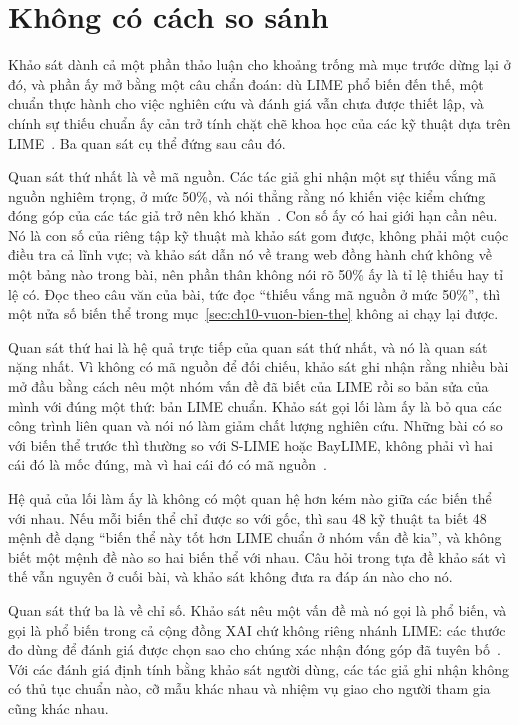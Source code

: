 \section{Không có cách so sánh}
\label{sec:ch10-khong-co-cach-so-sanh}

%
Khảo sát dành cả một phần thảo luận cho khoảng trống mà mục trước dừng lại ở
đó, và phần ấy mở bằng một câu chẩn đoán: dù LIME phổ biến đến thế, một chuẩn thực
hành cho việc nghiên cứu và đánh giá vẫn chưa được thiết lập, và chính sự thiếu
chuẩn ấy cản trở tính chặt chẽ khoa học của các kỹ thuật dựa trên
LIME~\autocite{p22whichlime}. Ba quan sát cụ thể đứng sau câu đó.

Quan sát thứ nhất là về mã nguồn. Các tác giả ghi nhận một sự thiếu vắng mã
nguồn nghiêm trọng, ở mức 50\%, và nói thẳng rằng nó khiến việc kiểm chứng đóng
góp của các tác giả trở nên khó khăn~\autocite{p22whichlime}. Con số ấy có hai
giới hạn cần nêu. Nó là con số của riêng tập kỹ thuật mà khảo sát gom được,
không phải một cuộc điều tra cả lĩnh vực; và khảo sát dẫn nó về trang web đồng
hành chứ không về một bảng nào trong bài, nên phần thân không nói rõ 50\% ấy là
tỉ lệ thiếu hay tỉ lệ có. Đọc theo câu văn của bài, tức đọc \enquote{thiếu vắng
mã nguồn ở mức 50\%}, thì một nửa số biến thể trong
mục~\ref{sec:ch10-vuon-bien-the} không ai chạy lại được.

Quan sát thứ hai là hệ quả trực tiếp của quan sát thứ nhất, và nó là quan sát
nặng nhất. Vì không có mã nguồn để đối chiếu, khảo sát ghi nhận rằng nhiều bài
mở đầu bằng cách nêu một nhóm vấn đề đã biết của LIME rồi so bản sửa của mình
với đúng một thứ: bản LIME chuẩn. Khảo sát gọi lối làm ấy là bỏ qua các công
trình liên quan và nói nó làm giảm chất lượng nghiên cứu. Những bài có so với
biến thể trước thì thường so với S-LIME hoặc BayLIME, không phải vì hai cái đó
là mốc đúng, mà vì hai cái đó có mã nguồn~\autocite{p22whichlime}.

Hệ quả của lối làm ấy là không có một quan hệ hơn kém nào giữa các biến thể
với nhau. Nếu mỗi biến thể chỉ được so
với gốc, thì sau 48 kỹ thuật ta biết 48 mệnh đề dạng \enquote{biến thể này
tốt hơn LIME chuẩn ở nhóm vấn đề kia}, và không biết một mệnh đề nào so hai
biến thể với nhau. Câu hỏi trong tựa đề khảo sát vì thế vẫn nguyên ở cuối bài,
và khảo sát không đưa ra đáp án nào cho nó.

Quan sát thứ ba là về chỉ số. Khảo sát nêu một vấn đề mà nó gọi là phổ biến,
và gọi là phổ biến trong cả cộng đồng XAI chứ không riêng nhánh LIME: các thước
đo dùng để đánh giá được chọn sao cho chúng xác nhận đóng góp đã tuyên
bố~\autocite{p22whichlime}. Với các đánh giá định tính bằng khảo sát người dùng,
các tác giả ghi nhận không có thủ tục chuẩn nào, cỡ mẫu khác nhau và nhiệm vụ
giao cho người tham gia cũng khác nhau.

